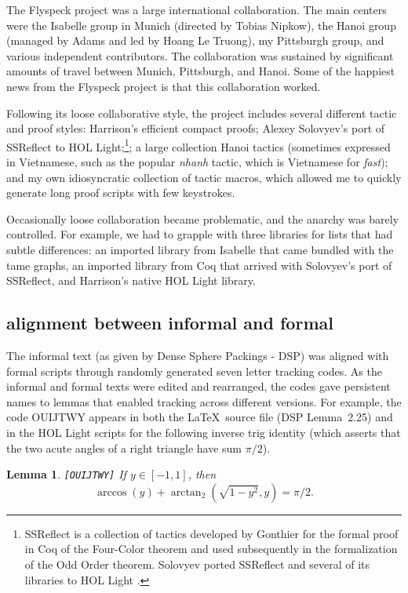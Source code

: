 \documentclass{amsart}
\newtheorem{lemma}[theorem]{Lemma}
\begin{document}
The Flyspeck project was a large international collaboration.  The
main centers were the Isabelle group in Munich (directed by Tobias
Nipkow), the Hanoi group (managed by Adams and led by Hoang Le
Truong), my Pittsburgh group, and various independent contributors.
The collaboration was sustained by significant amounts of travel
between Munich, Pittsburgh, and Hanoi.  Some of the happiest news from
the Flyspeck project is that this collaboration worked.

Following its loose collaborative style, the project includes several
different tactic and proof styles: Harrison's efficient compact
proofs; Alexey Solovyev's port of SSReflect to HOL
Light;\footnote{SSReflect is a collection of tactics developed by
  Gonthier for the formal proof in Coq of the Four-Color theorem and
  used subsequently in the formalization of the Odd Order
  theorem. Solovyev ported SSReflect and several of its libraries to
  HOL Light \cite{solovyev2013thesis}.}; a large collection Hanoi
tactics (sometimes expressed in Vietnamese, such as the popular
\emph{nhanh} tactic, which is Vietnamese for \emph{fast}); and my own
idiosyncratic collection of tactic macros, which allowed me to quickly
generate long proof scripts with few keystrokes.

Occasionally loose collaboration became problematic, and the anarchy
was barely controlled.  For example, we had to grapple with three
libraries for lists that had subtle differences: an imported library from
Isabelle that came bundled with the tame graphs, an imported library
from Coq that arrived with Solovyev's port of SSReflect, and
Harrison's native HOL Light library.

\subsection{alignment between informal and formal}

The informal text (as given by Dense Sphere Packings - DSP) was
aligned with formal scripts through randomly generated seven letter
tracking codes.  As the informal and formal texts were edited and
rearranged, the codes gave persistent names to lemmas that enabled
tracking across different versions.  For example, the code OUIJTWY
appears in both the \LaTeX\ source file (DSP Lemma~2.25) and in the
HOL Light scripts for the following inverse trig identity (which
asserts that the two acute angles of a right triangle have sum
$\pi/2$).

\begin{lemma}{\tt [OUIJTWY]} If $y\in [-1,1]$, then
\[
\arccos(y) + \arctan_2\left(\sqrt{1-y^2},y\right) = \pi/2.
\]
\end{lemma}
\end{document}
